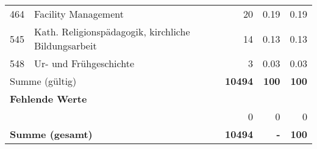 \begin{longtable}{lXrrr}
        464 & \multicolumn{1}{X}{Facility Management} & %
          \num{20} &
          \num[round-mode=places,round-precision=2]{0,19} &
          \num[round-mode=places,round-precision=2]{0,19} \\

        545 & \multicolumn{1}{X}{Kath. Religionspädagogik, kirchliche Bildungsarbeit} & %
          \num{14} &
          \num[round-mode=places,round-precision=2]{0,13} &
          \num[round-mode=places,round-precision=2]{0,13} \\

        548 & \multicolumn{1}{X}{Ur- und Frühgeschichte} & %
          \num{3} &
          \num[round-mode=places,round-precision=2]{0,03} &
          \num[round-mode=places,round-precision=2]{0,03} \\

     \midrule
     \multicolumn{2}{l}{Summe (gültig)} &
       \textbf{\num{10494}} &
     \textbf{100} &
       \textbf{\num[round-mode=places,round-precision=2]{100}} \\
     \multicolumn{5}{l}{\textbf{Fehlende Werte}}\\
      & & 0 & 0 & 0 \\
     \midrule
     \multicolumn{2}{l}{\textbf{Summe (gesamt)}} &
          \textbf{\num{10494}} &
        \textbf{-} &
        \textbf{100} \\
     \bottomrule
     \end{longtable}
     
